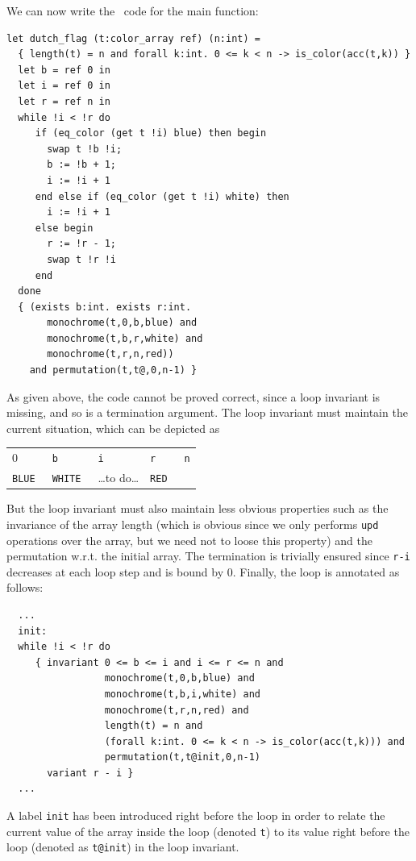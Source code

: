 \documentclass[a4paper,12pt]{report}
\begin{document}
We can now write the \why\ code for the main function:
\begin{verbatim}
let dutch_flag (t:color_array ref) (n:int) = 
  { length(t) = n and forall k:int. 0 <= k < n -> is_color(acc(t,k)) }
  let b = ref 0 in
  let i = ref 0 in
  let r = ref n in
  while !i < !r do
     if (eq_color (get t !i) blue) then begin
       swap t !b !i;
       b := !b + 1;
       i := !i + 1
     end else if (eq_color (get t !i) white) then
       i := !i + 1
     else begin
       r := !r - 1;
       swap t !r !i
     end
  done
  { (exists b:int. exists r:int. 
       monochrome(t,0,b,blue) and 
       monochrome(t,b,r,white) and 
       monochrome(t,r,n,red)) 
    and permutation(t,t@,0,n-1) }
\end{verbatim}
As given above, the code cannot be proved correct, since a loop
invariant is missing, and so is a termination argument. The loop
invariant must maintain the current situation, which can be depicted as
\begin{center}
  \begin{tabular}{|l|l|l|l|l}
    \multicolumn{1}{l}{0} & 
    \multicolumn{1}{l}{\texttt{b}} & 
    \multicolumn{1}{l}{\texttt{i}} & 
    \multicolumn{1}{l}{\texttt{r}} & 
    \multicolumn{1}{l}{\texttt{n}} \\\cline{1-4}
    \quad\texttt{BLUE}\quad~ & 
    \quad\texttt{WHITE}\quad~ & 
    \dots to do\dots & 
    \quad\texttt{RED}\quad~ \\\cline{1-4}
  \end{tabular}
\end{center}
But the loop invariant must also maintain less obvious properties such
as the invariance of the array length (which is obvious since we only performs
\texttt{upd} operations over the array, but we need not to loose this
property) and the permutation w.r.t. the initial array.
The termination is trivially ensured since \texttt{r-i} decreases at
each loop step and is bound by 0.
Finally, the loop is annotated as follows: 
%
\begin{verbatim}
  ...
  init:
  while !i < !r do
     { invariant 0 <= b <= i and i <= r <= n and
                 monochrome(t,0,b,blue) and 
                 monochrome(t,b,i,white) and 
                 monochrome(t,r,n,red) and
                 length(t) = n and
                 (forall k:int. 0 <= k < n -> is_color(acc(t,k))) and
                 permutation(t,t@init,0,n-1)
       variant r - i }
  ...
\end{verbatim}
A label \texttt{init} has been introduced right before the loop in
order to relate the current value of the array inside the loop
(denoted \texttt{t}) to its value right before the loop (denoted as
\texttt{t@init}) in the loop invariant.
\end{document}
